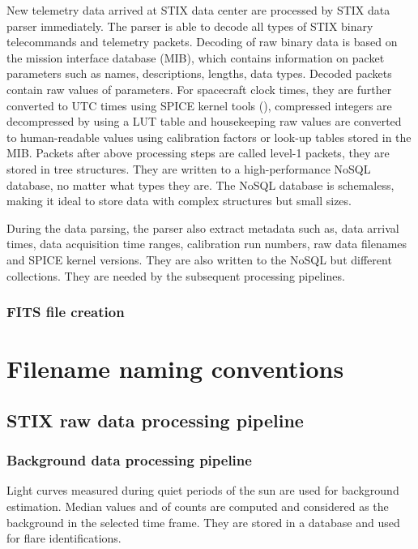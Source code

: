 \documentclass{aa}
\begin{document}
New telemetry data arrived at STIX data center are processed by STIX data parser immediately. 
The parser is able to decode all types of STIX binary telecommands and telemetry packets.   
Decoding of raw binary data is based on the mission interface database (MIB), which 
contains  information on packet parameters such as  names, descriptions, lengths,
data types. Decoded packets contain raw values of parameters. For spacecraft clock times,
they are further converted to UTC times using 
SPICE kernel tools (\cite{spice}), compressed integers are  
decompressed by using a LUT table and  housekeeping raw values are converted to 
human-readable values using calibration factors or look-up tables stored in the MIB. 
Packets after above processing steps  are called level-1 packets, they
 are stored in tree structures.  
 They are written to a high-performance NoSQL database, no matter what types they are. 
The NoSQL database is schemaless, making it ideal to store data with complex structures but small sizes. 

During the data parsing,  the parser also extract metadata  such as,  data arrival 
times, data acquisition  time ranges,  calibration run numbers,  raw data 
filenames and SPICE kernel versions.  They are also written to the NoSQL but different collections. 
They are needed by the subsequent processing pipelines. 




\subsubsection{FITS file creation}


\section{Filename naming conventions}

\subsection{STIX raw data processing pipeline}

\subsubsection{Background data processing pipeline}
Light curves measured during quiet periods of the sun are used for background estimation. Median values and of counts are computed and considered as the background in the selected time frame. They are stored in a database and used for flare identifications. 
\end{document}
